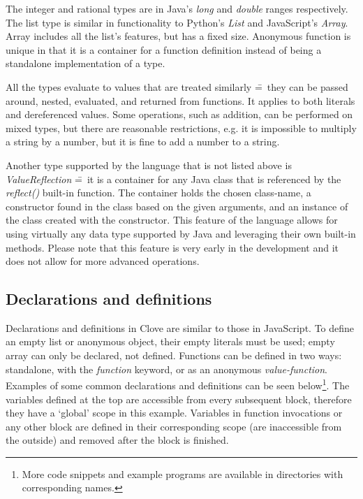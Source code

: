 \documentclass[12pt,a4paper]{article}
\begin{document}
\noindent The integer and rational types are in Java's \emph{long} and \emph{double} ranges respectively. The list type is similar in functionality to Python's \emph{List} and JavaScript's \emph{Array}. Array includes all the list's features, but has a fixed size. Anonymous function is unique in that it is a container for a function definition instead of being a standalone implementation of a type.\par

All the types evaluate to values that are treated similarly \==~they can be passed around, nested, evaluated, and returned from functions. It applies to both literals and dereferenced values. Some operations, such as addition, can be performed on mixed types, but there are reasonable restrictions, e.g. it is impossible to multiply a string by a number, but it is fine to add a number to a string.\par

Another type supported by the language that is not listed above is \emph{ValueReflection} \==~it is a container for any Java class that is referenced by the \emph{reflect()} built-in function. The container holds the chosen class-name, a constructor found in the class based on the given arguments, and an instance of the class created with the constructor. This feature of the language allows for using virtually any data type supported by Java and leveraging their own built-in methods. Please note that this feature is very early in the development and it does not allow for more advanced operations.



\subsection*{Declarations and definitions}
Declarations and definitions in Clove are similar to those in JavaScript. To define an empty list or anonymous object, their empty literals must be used; empty array can only be declared, not defined. Functions can be defined in two ways: standalone, with the \emph{function} keyword, or as an anonymous \emph{value-function}. Examples of some common declarations and definitions can be seen below\footnote{More code snippets and example programs are available in directories with corresponding names.}. The variables defined at the top are accessible from every subsequent block, therefore they have a `global' scope in this example. Variables in function invocations or any other block are defined in their corresponding scope (are inaccessible from the outside) and removed after the block is finished.
\end{document}
